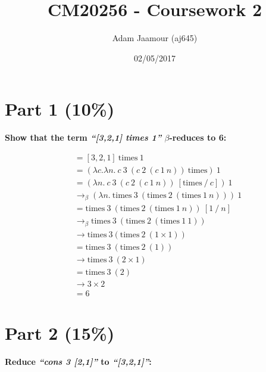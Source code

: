 \documentclass{article}
\title{CM20256 - Coursework 2}
\date{02/05/2017}
\author{Adam Jaamour (aj645)}
\begin{document}
	\newcommand{\lamb}{$\lambda$}
	\newcommand{\la}{\lambda}
	\newcommand{\be}{$\beta$}
	\newcommand{\tim}{\text{times}}
	\newcommand{\sa}{\quad}
	\newcommand{\equals}{\rightarrow_\beta}
	\newcommand{\equalsT}{\sa \rightarrow_\beta^*\sa}
	
	\maketitle
	\newpage
	
	\tableofcontents
	\newpage
	
	
	
	\section{Part 1 (10\%)}
	\textbf{Show that the term \textit{``[3,2,1] times 1''} $\beta$-reduces to 6:}

	\begin{Large}
		\begin{align*}
			&= [3,2,1] \ \tim \ 1 \\
			&= (\la c. \la n . \ c \ 3 \ (c \ 2 \ (c \ 1 \ n)) \ \tim ) \ 1 \\
			&= (\la n . \ c \ 3 \ (c \ 2 \ (c \ 1 \ n)) \ [\tim \ / \ c ]) \ 1 \\
			&\equals (\la n . \ \tim \ 3 \ (\tim \ 2 \ (\tim \ 1 \ n))) \ 1 \\
			&= \tim \ 3 \ (\tim \ 2 \ (\tim \ 1 \ n)) \ [1 \ / \ n] \\
			&\equals \tim \ 3 \ (\tim \ 2 \ (\tim \ 1 \ 1)) \\
			&\rightarrow \tim \ 3(\tim \ 2 \ (1 \times 1)) \\
			&= \tim \ 3 \ (\tim \ 2 \ (1)) \\
			&\rightarrow \tim \ 3 \ (2 \times 1) \\
			&= \tim \ 3 \ (2) \\
			&\rightarrow 3 \times 2 \\
			&= 6
		\end{align*}
	\end{Large}
	
	\newpage
	
	
	
	\section{Part 2 (15\%)}
	\textbf{Reduce \textit{``cons 3 [2,1]''} to \textit{``[3,2,1]''}:}
	
\end{document}
